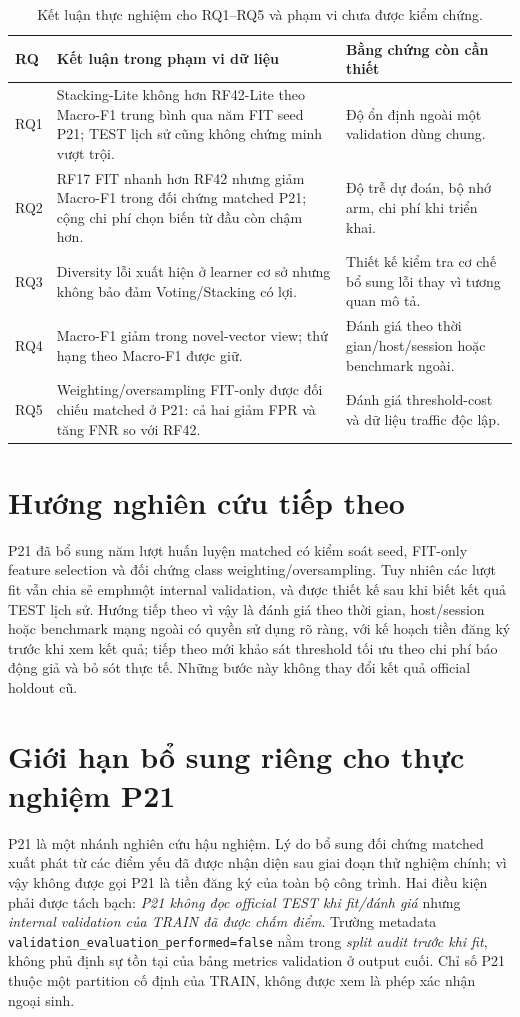 \begin{table}[htbp]
\centering
\small
\renewcommand{\arraystretch}{1.35}
\setlength{\tabcolsep}{6pt}
\caption{Kết luận thực nghiệm cho RQ1--RQ5 và phạm vi chưa được kiểm chứng.}
\label{tab:rq-evidence}
\begin{tabularx}{\linewidth}{p{0.9cm} X X}
\toprule
RQ & Kết luận trong phạm vi dữ liệu & Bằng chứng còn cần thiết\\
\midrule
RQ1 & Stacking-Lite không hơn RF42-Lite theo Macro-F1 trung bình qua năm FIT seed P21; TEST lịch sử cũng không chứng minh vượt trội. & Độ ổn định ngoài một validation dùng chung.\\
RQ2 & RF17 FIT nhanh hơn RF42 nhưng giảm Macro-F1 trong đối chứng matched P21; cộng chi phí chọn biến từ đầu còn chậm hơn. & Độ trễ dự đoán, bộ nhớ arm, chi phí khi triển khai.\\
RQ3 & Diversity lỗi xuất hiện ở learner cơ sở nhưng không bảo đảm Voting/Stacking có lợi. & Thiết kế kiểm tra cơ chế bổ sung lỗi thay vì tương quan mô tả.\\
RQ4 & Macro-F1 giảm trong novel-vector view; thứ hạng theo Macro-F1 được giữ. & Đánh giá theo thời gian/host/session hoặc benchmark ngoài.\\
RQ5 & Weighting/oversampling FIT-only được đối chiếu matched ở P21: cả hai giảm FPR và tăng FNR so với RF42. & Đánh giá threshold-cost và dữ liệu traffic độc lập.\\
\bottomrule
\end{tabularx}
\end{table}

\section{Hướng nghiên cứu tiếp theo}

P21 đã bổ sung năm lượt huấn luyện matched có kiểm soát seed, FIT-only feature selection và đối chứng class weighting/oversampling. Tuy nhiên các lượt fit vẫn chia sẻ emph{một} internal validation, và được thiết kế sau khi biết kết quả TEST lịch sử. Hướng tiếp theo vì vậy là đánh giá theo thời gian, host/session hoặc benchmark mạng ngoài có quyền sử dụng rõ ràng, với kế hoạch tiền đăng ký trước khi xem kết quả; tiếp theo mới khảo sát threshold tối ưu theo chi phí báo động giả và bỏ sót thực tế. Những bước này không thay đổi kết quả official holdout cũ.


\section{Giới hạn bổ sung riêng cho thực nghiệm P21}
\label{sec:p21-validity}
P21 là một nhánh nghiên cứu hậu nghiệm. Lý do bổ sung đối chứng matched xuất phát từ các điểm yếu đã được nhận diện sau giai đoạn thử nghiệm chính; vì vậy không được gọi P21 là tiền đăng ký của toàn bộ công trình. Hai điều kiện phải được tách bạch: \emph{P21 không đọc official TEST khi fit/đánh giá} nhưng \emph{internal validation của TRAIN đã được chấm điểm}. Trường metadata \texttt{validation\_evaluation\_performed=false} nằm trong \emph{split audit trước khi fit}, không phủ định sự tồn tại của bảng metrics validation ở output cuối. Chỉ số P21 thuộc một partition cố định của TRAIN, không được xem là phép xác nhận ngoại sinh.

